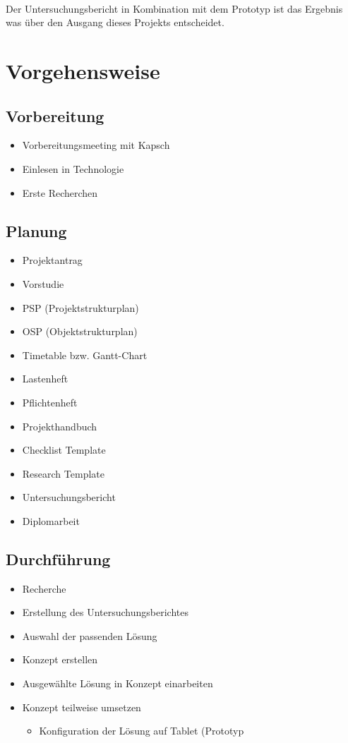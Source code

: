 \paragraph*{}
Der Untersuchungsbericht in Kombination mit dem Prototyp ist das Ergebnis was über den Ausgang dieses Projekts entscheidet.


\section{Vorgehensweise}
\subsection{Vorbereitung}
\begin{itemize}
	\item Vorbereitungsmeeting mit Kapsch
	\item Einlesen in Technologie
	\item Erste Recherchen
\end{itemize}
\subsection{Planung}
\begin{itemize}
	\item Projektantrag
	\item Vorstudie
	\item PSP (Projektstrukturplan)
	\item OSP (Objektstrukturplan)
	\item Timetable bzw. Gantt-Chart
	\item Lastenheft
	\item Pflichtenheft
	\item Projekthandbuch
	\item Checklist Template
	\item Research Template
	\item Untersuchungsbericht
	\item Diplomarbeit
\end{itemize}
\subsection{Durchführung}
\begin{itemize}
	\item Recherche
	\item Erstellung des Untersuchungsberichtes
	\item Auswahl der passenden Lösung
	\item Konzept erstellen
	\item Ausgewählte Lösung in Konzept einarbeiten
	\item Konzept teilweise umsetzen
	\begin{itemize}
		\item Konfiguration der Lösung auf Tablet (Prototyp
	\end{itemize}
\end{itemize}
